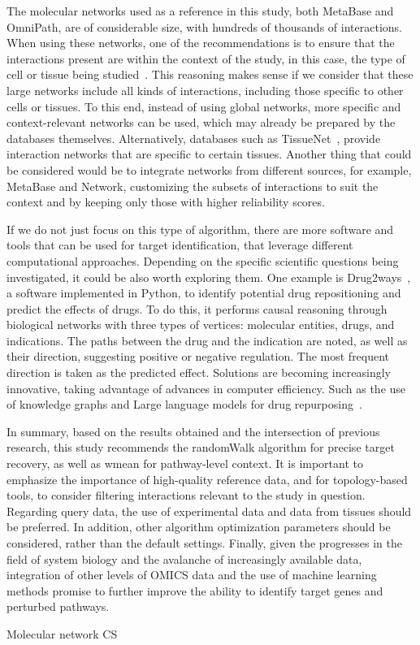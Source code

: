 The molecular networks used as a reference in this study, both MetaBase and OmniPath, are of considerable size, with hundreds of thousands of interactions. When using these networks, one of the recommendations is to ensure that the interactions present are within the context of the study, in this case, the type of cell or tissue being studied~\cite{RN38}. This reasoning makes sense if we consider that these large networks include all kinds of interactions, including those specific to other cells or tissues. To this end, instead of using global networks, more specific and context-relevant networks can be used, which may already be prepared by the databases themselves. Alternatively, databases such as TissueNet~\cite{RN137}, provide interaction networks that are specific to certain tissues. Another thing that could be considered would be to integrate networks from different sources, for example, MetaBase and Network, customizing the subsets of interactions to suit the context and by keeping only those with higher reliability scores. 

If we do not just focus on this type of algorithm, there are more software and tools that can be used for target identification, that leverage different computational approaches. Depending on the specific scientific questions being investigated, it could be also worth exploring them. One example is Drug2ways~\cite{RN132}, a software implemented in Python, to identify potential drug repositioning and predict the effects of drugs. To do this, it performs causal reasoning through biological networks with three types of vertices: molecular entities, drugs, and indications. The paths between the drug and the indication are noted, as well as their direction, suggesting positive or negative regulation. The most frequent direction is taken as the predicted effect. Solutions are becoming increasingly innovative, taking advantage of advances in computer efficiency. Such as the use of knowledge graphs and Large language models for drug repurposing~\cite{RN163}. 

In summary, based on the results obtained and the intersection of previous research, this study recommends the randomWalk algorithm for precise target recovery, as well as wmean for pathway-level context. It is important to emphasize the importance of high-quality reference data, and for topology-based tools, to consider filtering interactions relevant to the study in question. Regarding query data, the use of experimental data and data from tissues should be preferred. In addition, other algorithm optimization parameters should be considered, rather than the default settings. Finally, given the progresses in the field of system biology and the avalanche of increasingly available data, integration of other levels of OMICS data and the use of machine learning methods promise to further improve the ability to identify target genes and perturbed pathways.


\gls{Molecular network}
\gls{CS}
